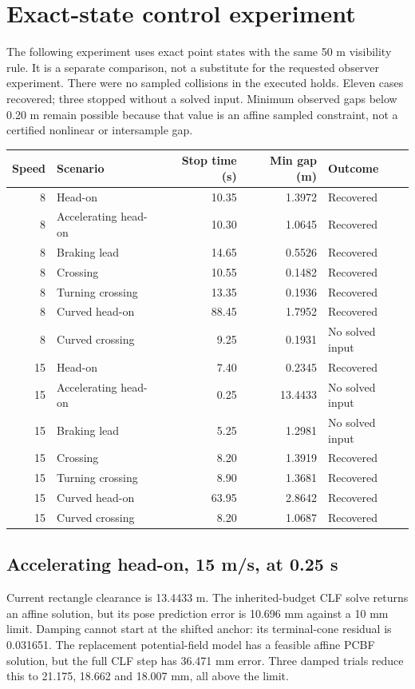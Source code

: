\documentclass[11pt]{article}
\begin{document}
\section{Exact-state control experiment}
The following experiment uses exact point states with the same 50 m visibility
rule. It is a separate comparison, not a substitute for the requested observer
experiment. There were no sampled collisions in the executed holds. Eleven
cases recovered; three stopped without a solved input. Minimum observed gaps
below 0.20 m remain possible because that value is an affine sampled constraint,
not a certified nonlinear or intersample gap.

\begin{center}\small
\begin{tabular}{rlrrl}
\toprule
Speed & Scenario & Stop time (s) & Min gap (m) & Outcome\\
\midrule
8 & Head-on & 10.35 & 1.3972 & Recovered \\
8 & Accelerating head-on & 10.30 & 1.0645 & Recovered \\
8 & Braking lead & 14.65 & 0.5526 & Recovered \\
8 & Crossing & 10.55 & 0.1482 & Recovered \\
8 & Turning crossing & 13.35 & 0.1936 & Recovered \\
8 & Curved head-on & 88.45 & 1.7952 & Recovered \\
8 & Curved crossing & 9.25 & 0.1931 & No solved input \\
15 & Head-on & 7.40 & 0.2345 & Recovered \\
15 & Accelerating head-on & 0.25 & 13.4433 & No solved input \\
15 & Braking lead & 5.25 & 1.2981 & No solved input \\
15 & Crossing & 8.20 & 1.3919 & Recovered \\
15 & Turning crossing & 8.90 & 1.3681 & Recovered \\
15 & Curved head-on & 63.95 & 2.8642 & Recovered \\
15 & Curved crossing & 8.20 & 1.0687 & Recovered \\
\bottomrule
\end{tabular}
\end{center}

\subsection{Accelerating head-on, 15 m/s, at 0.25 s}
Current rectangle clearance is 13.4433 m. The inherited-budget CLF solve returns
an affine solution, but its pose prediction error is 10.696 mm against a 10 mm
limit. Damping cannot start at the shifted anchor: its terminal-cone residual
is 0.031651. The replacement potential-field model has a feasible affine PCBF
solution, but the full CLF step has 36.471 mm error. Three damped trials reduce
this to 21.175, 18.662 and 18.007 mm, all above the limit.
\end{document}
